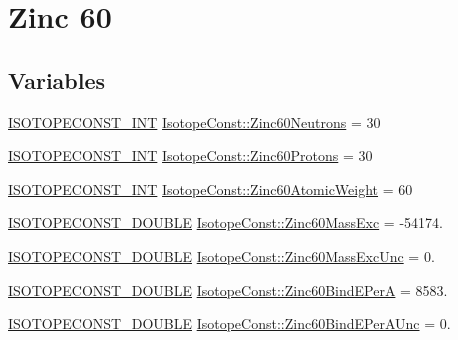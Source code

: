 \hypertarget{group___isotope_const-_zinc-_zn60}{}\section{Zinc 60}
\label{group___isotope_const-_zinc-_zn60}
\subsection*{Variables}
\begin{DoxyCompactItemize}
\item 
\mbox{\hyperlink{group___isotope_const-_macros_ga5f18360b3e99483a35c32d789e62621c}{I\+S\+O\+T\+O\+P\+E\+C\+O\+N\+S\+T\+\_\+\+I\+NT}} \mbox{\hyperlink{group___isotope_const-_zinc-_zn60_gaeafdc0fb5dc558d1b69402fc6eb36dd5}{Isotope\+Const\+::\+Zinc60\+Neutrons}} = 30
\item 
\mbox{\hyperlink{group___isotope_const-_macros_ga5f18360b3e99483a35c32d789e62621c}{I\+S\+O\+T\+O\+P\+E\+C\+O\+N\+S\+T\+\_\+\+I\+NT}} \mbox{\hyperlink{group___isotope_const-_zinc-_zn60_ga4f4ca29f5e326db2b3709965410df7ef}{Isotope\+Const\+::\+Zinc60\+Protons}} = 30
\item 
\mbox{\hyperlink{group___isotope_const-_macros_ga5f18360b3e99483a35c32d789e62621c}{I\+S\+O\+T\+O\+P\+E\+C\+O\+N\+S\+T\+\_\+\+I\+NT}} \mbox{\hyperlink{group___isotope_const-_zinc-_zn60_gac8e630854ef99595f8dd6fb6c91dec13}{Isotope\+Const\+::\+Zinc60\+Atomic\+Weight}} = 60
\item 
\mbox{\hyperlink{group___isotope_const-_macros_ga8f45a7272ce02c0b4c65c44636ed719a}{I\+S\+O\+T\+O\+P\+E\+C\+O\+N\+S\+T\+\_\+\+D\+O\+U\+B\+LE}} \mbox{\hyperlink{group___isotope_const-_zinc-_zn60_ga7af7b207caa69832bbd8e9c2f396b1af}{Isotope\+Const\+::\+Zinc60\+Mass\+Exc}} = -\/54174.
\item 
\mbox{\hyperlink{group___isotope_const-_macros_ga8f45a7272ce02c0b4c65c44636ed719a}{I\+S\+O\+T\+O\+P\+E\+C\+O\+N\+S\+T\+\_\+\+D\+O\+U\+B\+LE}} \mbox{\hyperlink{group___isotope_const-_zinc-_zn60_ga8adaed9d158ed83dc3dac45d46953c1b}{Isotope\+Const\+::\+Zinc60\+Mass\+Exc\+Unc}} = 0.
\item 
\mbox{\hyperlink{group___isotope_const-_macros_ga8f45a7272ce02c0b4c65c44636ed719a}{I\+S\+O\+T\+O\+P\+E\+C\+O\+N\+S\+T\+\_\+\+D\+O\+U\+B\+LE}} \mbox{\hyperlink{group___isotope_const-_zinc-_zn60_gad6f5fb22d868126d8c1756e86c269e8e}{Isotope\+Const\+::\+Zinc60\+Bind\+E\+PerA}} = 8583.
\item 
\mbox{\hyperlink{group___isotope_const-_macros_ga8f45a7272ce02c0b4c65c44636ed719a}{I\+S\+O\+T\+O\+P\+E\+C\+O\+N\+S\+T\+\_\+\+D\+O\+U\+B\+LE}} \mbox{\hyperlink{group___isotope_const-_zinc-_zn60_ga8b7534b44d1d176b885a983c5440692a}{Isotope\+Const\+::\+Zinc60\+Bind\+E\+Per\+A\+Unc}} = 0.

\end{DoxyCompactItemize}
